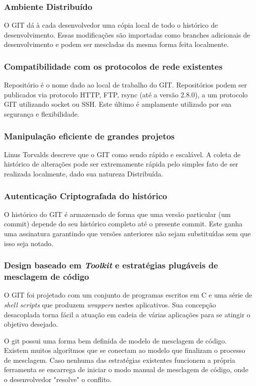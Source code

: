 \documentclass[
	article,			%
	12pt,				%
	oneside,			%
	a4paper,			%
	english,			
	brazil,
	sumario=tradicional
	]{abntex2}
\begin{document}
\subsubsection{Ambiente Distribuído}

O GIT dá à cada desenvolvedor uma cópia local de todo o histórico de desenvolvimento. Essas modificações são importadas como branches adicionais de desenvolvimento e podem ser mescladas da mesma forma feita localmente. \cite{gitscm.3}

\subsubsection{Compatibilidade com os protocolos de rede existentes}
Repositório é o nome dado ao local de trabalho do GIT. Repositórios podem ser publicados via protocolo HTTP, FTP, rsync (até a versão 2.8.0), a um protocolo GIT utilizando socket ou SSH. Este último é amplamente utilizado por sua segurança e flexibilidade.

\subsubsection{Manipulação eficiente de grandes projetos}
Linus Torvalds descreve que o GIT como sendo rápido e escalável. A coleta de histórico de alterações pode ser extremamente rápida pelo simples fato de ser realizada localmente, dado sua natureza Distribuída. \cite{gitscm.2}

\subsubsection{Autenticação Criptografada do histórico}
O histórico do GIT é armazenado de forma que uma versão particular (um commit) depende do seu histórico completo até o presente commit. Este ganha uma assinatura garantindo que versões anteriores não sejam substituídas sem que isso seja notado.

\subsubsection{Design baseado em \textit{Toolkit} e estratégias plugáveis de mesclagem de código}
O GIT foi projetado com um conjunto de programas escritos em C e uma série de \textit{shell scripts} que produzem \textit{wrappers} nestes aplicativos. Sua concepção desacoplada torna fácil a atuação em cadeia de várias aplicações para se atingir o objetivo desejado.

O git possui uma forma bem definida de modelo de mesclagem de código. Existem muitos algorítmos que se conectam ao modelo que finalizam o processo de mesclagem. Caso nenhuma das estratégias existentes funcionem a própria ferramenta se encarrega de iniciar o modo manual de mesclagem de código, onde o desenvolvedor "resolve" o conflito.
\end{document}
